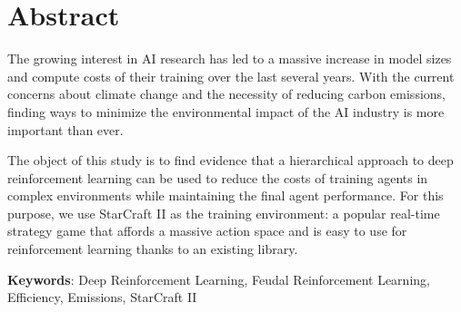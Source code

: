 \chapter*{Abstract}

The growing interest in AI research has led to a massive increase in model sizes and compute costs of their training over the last several years. With the current concerns about climate change and the necessity of reducing carbon emissions, finding ways to minimize the environmental impact of the AI industry is more important than ever.

The object of this study is to find evidence that a hierarchical approach to deep reinforcement learning can be used to reduce the costs of training agents in complex environments while maintaining the final agent performance. For this purpose, we use StarCraft II as the training environment: a popular real-time strategy game that affords a massive action space and is easy to use for reinforcement learning thanks to an existing library.

\vspace{1.5cm}

\textbf{Keywords}: Deep Reinforcement Learning, Feudal Reinforcement Learning, Efficiency, Emissions, StarCraft II
